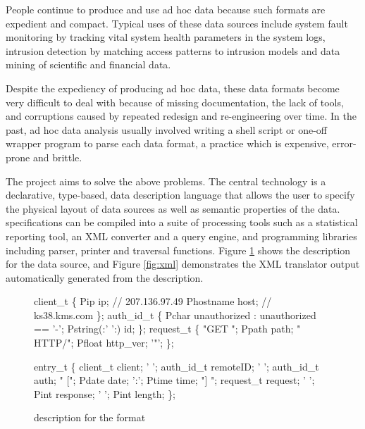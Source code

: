 People continue to produce and use ad hoc data because such formats 
are expedient and compact.  
Typical uses of these data sources include system fault monitoring
by tracking vital system health parameters in the system logs,
intrusion detection by matching access patterns to intrusion
models and data mining of scientific and financial data.

Despite the expediency of producing ad hoc data, these
data formats become very difficult to deal with because of missing
documentation, the lack of tools, and corruptions caused by
repeated redesign and re-engineering over time. 
In the past, ad hoc data analysis usually involved
writing a shell script or one-off wrapper program to parse each 
data format, a practice which is expensive, error-prone and brittle.

The \pads{} project \cite{padsweb} aims to solve the above 
problems. The central technology is a declarative, type-based, 
data description language that allows the user to specify the physical
layout of data sources as well as semantic properties of the data. 
\pads{} specifications can be compiled into a suite of
processing tools such as a statistical reporting tool, an 
XML converter and a query engine, and programming libraries 
including parser, printer and traversal functions. Figure \ref{fig:ai.p}
shows the \pads{} description for the \ai{} data source, and
Figure \ref{fig:xml} demonstrates the XML translator
output automatically generated from the \pads{} description.

\begin{figure}[th]
\begin{minipage}[t]{0.45\columnwidth}
\begin{code}
{\scriptsize
{} client_t \{
  Pip       ip;      // 207.136.97.49
  Phostname host;    // ks38.kms.com
\};
\vs
{} auth_id_t \{
  Pchar unauthorized : unauthorized == '-';
  Pstring(:' ':) id;
\};
\vs
{} request_t \{
   "GET ";    Ppath    path;
   " HTTP/";  Pfloat   http_ver;
   '"';
\};
\shrink
}
\end{code}
\end{minipage}
\hfill
\begin{minipage}[t]{0.45\columnwidth}
\begin{code}
{\scriptsize
{}  entry_t \{
         client_t       client;
   ' ';  auth_id_t      remoteID;
   ' ';  auth_id_t      auth;
   " ["; Pdate          date;
   ':';  Ptime          time;
   "] "; request_t      request;
   ' ';  Pint           response;
   ' ';  Pint           length;
\};
\shrink
}
\end{code}
\end{minipage}
\caption{\padsc{} description for the \ai{} format}
\label{fig:ai.p}
\shrink
\end{figure}

